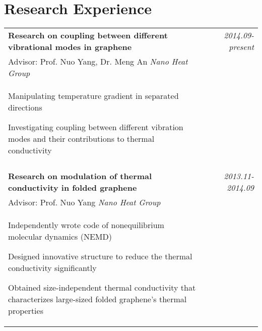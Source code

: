\documentclass[a4paper,10pt]{article}
\begin{document}
\section{Research Experience}
\begin{tabular}{p{13.5cm}p{0.5cm}r}
\textbf{Research on coupling between different vibrational modes in graphene} && \emph{2014.09-present} \\
\hspace{1em} Advisor: Prof. Nuo Yang, Dr. Meng An \hspace{3em} \emph{Nano Heat Group} && \vspace{-0.5em}\\
\begin{compactitem}
       \item Manipulating temperature gradient in separated directions \vspace{0.2em}
       \item Investigating coupling between different vibration modes and their contributions to thermal conductivity\vspace{0.2em}
     \end{compactitem}&&\vspace{-2.2em} \\
\multicolumn{3}{c}{} \\
\textbf{Research on modulation of thermal conductivity in folded graphene} && \emph{2013.11-2014.09} \\
\hspace{1em} Advisor: Prof. Nuo Yang \hspace{9em} \emph{Nano Heat Group} && \vspace{-0.5em}\\
\begin{compactitem}
       \item Independently wrote code of nonequilibrium molecular dynamics (NEMD)\vspace{0.2em}
       \item Designed innovative structure to reduce the thermal conductivity significantly\vspace{0.2em}
       \item Obtained size-independent thermal conductivity that characterizes large-sized folded graphene's thermal properties
     \end{compactitem}&&\vspace{-2.2em} \\

\end{tabular}
\end{document}
